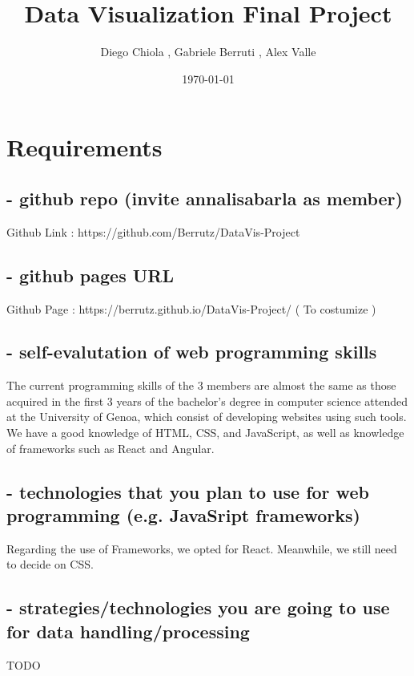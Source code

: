 \documentclass{article}
\title{Data Visualization Final Project}
\author{Diego Chiola , Gabriele Berruti , Alex Valle}
\date{\today}                %
\begin{document}
\maketitle                   %

\section{Requirements}

\subsection{- github repo (invite annalisabarla as member)}
Github Link : https://github.com/Berrutz/DataVis-Project

\subsection{- github pages URL}
Github Page : https://berrutz.github.io/DataVis-Project/   ( To costumize )

\subsection{- self-evalutation of web programming skills}
The current programming skills of the 3 members are almost the same as those acquired in the first 
3 years of the bachelor's degree in computer science attended at the University of Genoa, 
which consist of developing websites using such tools. We have a good knowledge of HTML, CSS, and JavaScript, 
as well as knowledge of frameworks such as React and Angular.

\subsection{- technologies that you plan to use for web programming (e.g. JavaSript frameworks)}
Regarding the use of Frameworks, we opted for React. Meanwhile, we still need to decide on CSS. 


\subsection{- strategies/technologies you are going to use for data handling/processing}
TODO
\end{document}
